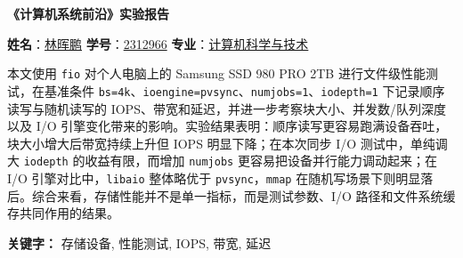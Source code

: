 \documentclass[a4paper]{article}
\begin{document}
\renewcommand{\contentsname}{目\ 录}
\renewcommand{\appendixname}{附录}
\renewcommand{\appendixpagename}{附录}
\renewcommand{\refname}{参考文献} 
\renewcommand{\figurename}{图}
\renewcommand{\tablename}{表}
\renewcommand{\today}{\number\year 年 \number\month 月 \number\day 日}


\renewcommand {\thefigure}{\thesection{}.\arabic{figure}}%
\renewcommand{\figurename}{图}
\renewcommand{\contentsname}{目录}  

\renewcommand{\abstractname}{\textbf{\Large 摘要}} %

\newpage
\begin{center}
    \huge{\textbf{《计算机系统前沿》实验报告}}
\end{center}

\begin{center}
    \textbf{姓名}：\underline{林晖鹏} \quad
    \textbf{学号}：\underline{2312966} \quad
    \textbf{专业}：\underline{计算机科学与技术}
\end{center}

\vspace{1em} %

\tableofcontents

\vspace{2em} %



\vspace{2em}
\noindent %
本文使用 \texttt{fio} 对个人电脑上的 Samsung SSD 980 PRO 2TB 进行文件级性能测试，在基准条件 \texttt{bs=4k}、\texttt{ioengine=pvsync}、\texttt{numjobs=1}、\texttt{iodepth=1} 下记录顺序读写与随机读写的 IOPS、带宽和延迟，并进一步考察块大小、并发数/队列深度以及 I/O 引擎变化带来的影响。实验结果表明：顺序读写更容易跑满设备吞吐，块大小增大后带宽持续上升但 IOPS 明显下降；在本次同步 I/O 测试中，单纯调大 \texttt{iodepth} 的收益有限，而增加 \texttt{numjobs} 更容易把设备并行能力调动起来；在 I/O 引擎对比中，\texttt{libaio} 整体略优于 \texttt{pvsync}，\texttt{mmap} 在随机写场景下则明显落后。综合来看，存储性能并不是单一指标，而是测试参数、I/O 路径和文件系统缓存共同作用的结果。

\vspace{1em} %
\noindent %
\textbf{关键字：} 存储设备, 性能测试, IOPS, 带宽, 延迟
\end{document}
